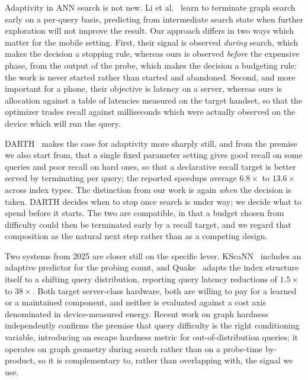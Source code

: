 \documentclass[journal]{IEEEtran}
\begin{document}
Adaptivity in ANN search is not new. Li et al.~\cite{li2020earlytermination}
learn to terminate graph search early on a per-query basis, predicting from
intermediate search state when further exploration will not improve the
result. Our approach differs in two ways which matter for the mobile
setting. First, their signal is observed \emph{during} search, which makes
the decision a stopping rule, whereas ours is observed \emph{before} the
expensive phase, from the output of the probe, which makes the decision a
budgeting rule: the work is never started rather than started and
abandoned. Second, and more important for a phone, their objective is
latency on a server, whereas ours is allocation against a table of
latencies measured on the target handset, so that the optimizer trades
recall against milliseconds which were actually observed on the device
which will run the query.

DARTH~\cite{chatzakis2026darth} makes the case for adaptivity more sharply
still, and from the premise we also start from, that a single fixed
parameter setting gives good recall on some queries and poor recall on hard
ones, so that a declarative recall target is better served by terminating
per query; the reported speedups average $6.8\times$ to $13.6\times$ across
index types. The distinction from our work is again \emph{when} the
decision is taken. DARTH decides when to stop once search is under way; we
decide what to spend before it starts. The two are compatible, in that a
budget chosen from difficulty could then be terminated early by a recall
target, and we regard that composition as the natural next step rather than
as a competing design.

Two systems from 2025 are closer still on the specific lever.
KScaNN~\cite{senkevich2025kscann} includes an adaptive predictor for the
probing count, and Quake~\cite{mohoney2025quake} adapts the index structure
itself to a shifting query distribution, reporting query latency reductions
of $1.5\times$ to $38\times$. Both target server-class hardware, both are
willing to pay for a learned or a maintained component, and neither is
evaluated against a cost axis denominated in device-measured energy. Recent
work on graph hardness~\cite{hua2026hardness} independently confirms the
premise that query difficulty is the right conditioning variable,
introducing an escape hardness metric for out-of-distribution queries; it
operates on graph geometry during search rather than on a probe-time
by-product, so it is complementary to, rather than overlapping with, the
signal we use.
\end{document}
